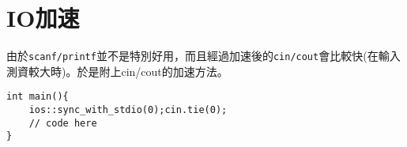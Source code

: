 \section{IO加速}
    由於\verb|scanf/printf|並不是特別好用，而且經過加速後的\verb|cin/cout|會比較快(在輸入測資較大時)。於是附上cin/cout的加速方法。

    \begin{lstlisting}[caption=IO加速]
int main(){
    ios::sync_with_stdio(0);cin.tie(0);
    // code here
}\end{lstlisting}